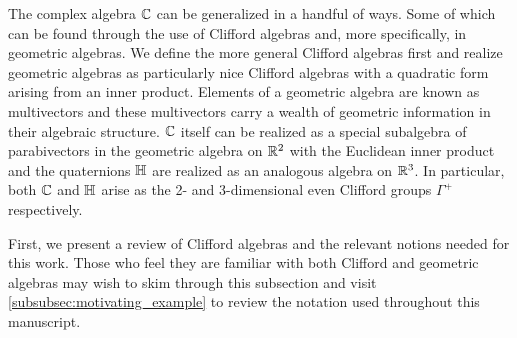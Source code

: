 
The complex algebra $\mathbb{C}$ can be generalized in a handful of ways.  Some of which can be found through the use of Clifford algebras and, more specifically, in geometric algebras.  We define the more general Clifford algebras first and realize geometric algebras as particularly nice Clifford algebras with a quadratic form arising from an inner product. Elements of a geometric algebra are known as multivectors and these multivectors carry a wealth of geometric information in their algebraic structure. $\mathbb{C}$ itself can be realized as a special subalgebra of parabivectors in the geometric algebra on $\mathbb{R}^2$ with the Euclidean inner product and the quaternions $\mathbb{H}$ are realized as an analogous algebra on $\mathbb{R}^3$. In particular, both $\mathbb{C}$ and $\mathbb{H}$ arise as the 2- and 3-dimensional even Clifford groups $\Gamma^+$ respectively. 

First, we present a review of Clifford algebras and the relevant notions needed for this work. Those who feel they are familiar with both Clifford and geometric algebras may wish to skim through this subsection and visit \cref{subsubsec:motivating_example} to review the notation used throughout this manuscript. 

